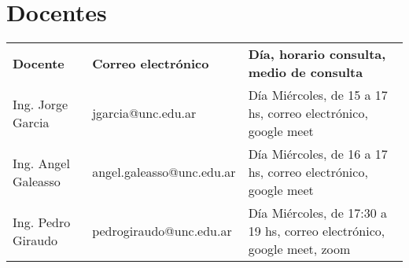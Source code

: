 \section*{Docentes}
\label{00.docentes}

  \begin{tabular}{llm{}} \rowcolor{yellow!30}
 {\bf Docente} & {\bf Correo electr\'onico} & {\bf D\'ia, horario consulta, medio de consulta} \\ \rowcolor{cyan!20}
  Ing. Jorge Garcia & jgarcia@unc.edu.ar & D\'ia Mi\'ercoles, de 15 a 17 hs, correo electr\'onico, google meet \\ 
  Ing. Angel Galeasso & angel.galeasso@unc.edu.ar & D\'ia Mi\'ercoles, de 16 a 17 hs, correo electr\'onico, google meet    \\ \rowcolor{cyan!20} 
  Ing. Pedro Giraudo  & pedrogiraudo@unc.edu.ar &  D\'ia Mi\'ercoles, de 17:30 a 19 hs, correo electr\'onico, google meet, zoom     \\
\end{tabular}